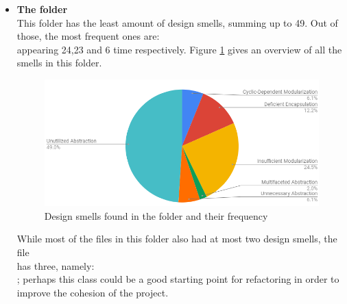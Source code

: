 \begin{itemize}
            \item \textbf{The  folder}\\
            This folder has the least amount of design smells, summing up to 49. Out of those, the most frequent ones are: \\
             appearing 24,23 and 6 time respectively. Figure \ref{fig:configdesignsmells} gives an overview of all the smells in this folder.
             \begin{figure}[H]
                \centering
                \includegraphics[scale=.8]{figures/step4/designsmellconfig.PNG}
                \caption{Design smells found in the  folder and their frequency}
                \label{fig:configdesignsmells}
            \end{figure}
            While most of the files in this folder also had at most two design smells, the file\\ 
             has three, namely: \\
            ; perhaps this class could be a good starting point for refactoring in order to improve the cohesion of the project.
            

\end{itemize}
